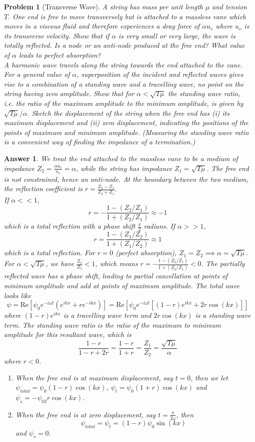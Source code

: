 \documentclass[a4paper]{article}
\newtheorem{ans}{Answer}[section]
\theoremstyle{new}
\newtheorem{qns}{Problem}[section]
\begin{document}
\begin{qns}[Transverse Wave]
A string has mass per unit length $\mu$ and tension $T$. One end is free to move transversely but is attached to a massless vane which moves in a viscous fluid and therefore experiences a drag force of $\alpha u_v$ where $u_v$ is its transverse velocity. Show that if $\alpha$ is very small or very large, the wave is totally reflected. Is a node or an anti-node produced at the free end? What value of $\alpha$ leads to perfect absorption?\\[5pt]
A harmonic wave travels along the string towards the end attached to the vane. For a general value of $\alpha$, superposition of the incident and reflected waves gives rise to a combination of a standing wave and a travelling wave, no point on the string having zero amplitude. Show that for $\alpha<\sqrt{T\mu}$ the standing wave ratio, i.e. the ratio of the maximum amplitude to the minimum amplitude, is given by $\sqrt{T\mu}/\alpha$. Sketch the displacement of the string when the free end has (i) its maximum displacement and (ii) zero displacement, indicating the positions of the points of maximum and minimum amplitude. (Measuring the standing wave ratio is a convenient way of finding the impedance of a termination.)
\end{qns}
\newpage
\begin{ans}
We treat the end attached to the massless vane to be a medium of impedance $Z_2=\frac{\alpha u_v}{u_v}=\alpha$, while the string has impedance $Z_1=\sqrt{T\mu}$. The free end is not constrained, hence an anti-node. At the boundary between the two medium, the reflection coefficient is $r=\frac{Z_2-Z_1}{Z_2+Z_1}$.\\[5pt]
If $\alpha<<1$, $$r=-\frac{1-(Z_2/Z_1)}{1+(Z_2/Z_1)}\approx -1$$ which is a total reflection with a phase shift $\frac{\pi}{2}$ radians. If $\alpha>>1$, $$r=\frac{1-(Z_1/Z_2)}{1+(Z_1/Z_2)}\approx 1$$
which is a total reflection. For $r=0$ (perfect absorption), $Z_1=Z_2\implies\alpha=\sqrt{T\mu}$.\\[5pt]
For $\alpha<\sqrt{T\mu}$, we have $\frac{Z_2}{Z_1}<1$, which means $r=-\frac{1-(Z_2/Z_1)}{1+(Z_2/Z_1)}<0$. The partially reflected wave has a phase shift, leading to partial cancellation at points of minimum amplitude and add at points of maximum amplitude. The total wave looks like
$$\psi=\text{Re}[\psi_0e^{-i\omega t}(e^{ikx}+re^{-ikx})]=\text{Re}[\psi_0e^{-i\omega t}[(1-r)e^{ikx}+2r\cos(kx)]]$$
where $(1-r)e^{ikx}$ is a travelling wave term and $2r\cos(kx)$ is a standing wave term. The standing wave ratio is the ratio of the maximum to minimum amplitude for this resultant wave, which is $$\frac{1-r}{1-r+2r}=\frac{1-r}{1+r}=\frac{Z_1}{Z_2}=\frac{\sqrt{T\mu}}{\alpha}$$ where $r<0$.
\begin{enumerate}[label=(\roman*)]
\item When the free end is at maximum displacement, say $t=0$, then we let $\psi_{total}=\psi_0(1-r)\cos(kx)$, $\psi_t=\psi_0(1+r)\cos(kx)$ and $\psi_s=-\psi_02r\cos(kx)$.
\item When the free end is at zero displacement, say $t=\frac{\pi}{2\omega}$, then $$\psi_{total}=\psi_t=(1-r)\psi_0\sin(kx)$$ and $\psi_s=0$.
\end{enumerate}
\end{ans}
\end{document}
